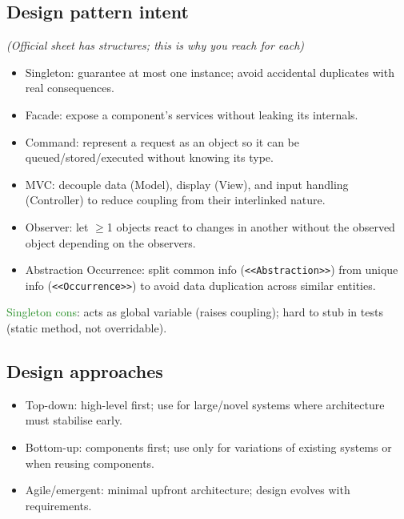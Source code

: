 \subsection{Design pattern intent}
\textit{(Official sheet has structures; this is \emph{why} you reach for each)}
\begin{itemize}
  \item \textcolor{Bittersweet}{Singleton}: guarantee at most one instance; avoid accidental duplicates with real consequences.
  \item \textcolor{Bittersweet}{Facade}: expose a component's services without leaking its internals.
  \item \textcolor{Bittersweet}{Command}: represent a request as an object so it can be queued/stored/executed without knowing its type.
  \item \textcolor{Bittersweet}{MVC}: decouple data (Model), display (View), and input handling (Controller) to reduce coupling from their interlinked nature.
  \item \textcolor{Bittersweet}{Observer}: let $\ge$1 objects react to changes in another without the observed object depending on the observers.
  \item \textcolor{Bittersweet}{Abstraction Occurrence}: split common info (\texttt{<<Abstraction>>}) from unique info (\texttt{<<Occurrence>>}) to avoid data duplication across similar entities.
\end{itemize}
\textcolor{ForestGreen}{Singleton cons}: acts as global variable (raises coupling); hard to stub in tests (static method, not overridable).

\subsection{Design approaches}
\begin{itemize}
  \item \textcolor{Bittersweet}{Top-down}: high-level first; use for large/novel systems where architecture must stabilise early.
  \item \textcolor{Bittersweet}{Bottom-up}: components first; use only for variations of existing systems or when reusing components.
  \item \textcolor{Bittersweet}{Agile/emergent}: minimal upfront architecture; design evolves with requirements.
\end{itemize}
